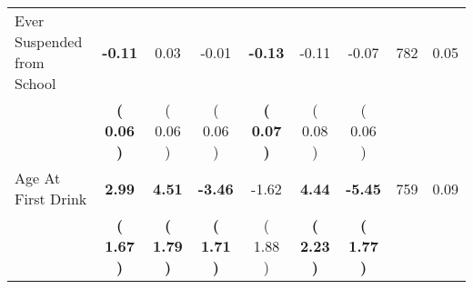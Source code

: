 \begin{tabular}{lcccccccc}
Ever Suspended from School & \textbf{    -0.11} &      0.03 &     -0.01 & \textbf{    -0.13} &     -0.11 &     -0.07 & 782 &       0.05 \\ 
 & \textbf{(     0.06 )} & (     0.06 ) & (     0.06 ) & \textbf{(     0.07 )} & (     0.08 ) & (     0.06 ) & \\
Age At First Drink & \textbf{     2.99} & \textbf{     4.51} & \textbf{    -3.46} &     -1.62 & \textbf{     4.44} & \textbf{    -5.45} & 759 &       0.09 \\ 
 & \textbf{(     1.67 )} & \textbf{(     1.79 )} & \textbf{(     1.71 )} & (     1.88 ) & \textbf{(     2.23 )} & \textbf{(     1.77 )} & \\
\bottomrule
\end{tabular}
